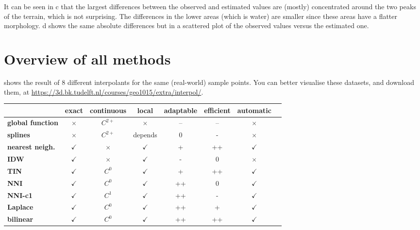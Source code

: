 It can be seen in c that the largest differences between the observed and estimated values are (mostly) concentrated around the two peaks of the terrain, which is not surprising.
The differences in the lower areas (which is water) are smaller since these areas have a flatter morphology.
d shows the same absolute differences but in a scattered plot of the observed values versus the estimated one.



%
\section{Overview of all methods}

 shows the result of 8 different interpolants for the same (real-world) sample points.
You can better visualise these datasets, and download them, at \url{https://3d.bk.tudelft.nl/courses/geo1015/extra/interpol/}.


\begin{tabular}{@{}lccccccl@{}}
\toprule
                         & exact         & continuous & local        & adaptable & efficient & automatic \\ \midrule
\textbf{global function} & $\times$      & $C^{2+}$   & $\times$     & --        & --        & $\times$     \\
\textbf{splines}         & $\times$      & $C^{2+}$   & depends      & 0         & -         & $\times$     \\ 
\textbf{nearest neigh.}  & $\checkmark$  & $\times$   & $\checkmark$ & +         & ++        & $\checkmark$ \\ 
\textbf{IDW}             & $\checkmark$  & $\times$   & $\checkmark$ & -         & 0         & $\times$     \\ 
\textbf{TIN}             & $\checkmark$  & $C^0$      & $\checkmark$ & +         & ++        & $\checkmark$ \\ 
\textbf{NNI}             & $\checkmark$  & $C^0$      & $\checkmark$ & ++        & 0         & $\checkmark$ \\ 
\textbf{NNI-c1}          & $\checkmark$  & $C^1$      & $\checkmark$ & ++        & -         & $\checkmark$ \\ 
\textbf{Laplace}         & $\checkmark$  & $C^0$      & $\checkmark$ & ++        & +         & $\checkmark$ \\ 
\textbf{bilinear}        & $\checkmark$  & $C^0$      & $\checkmark$ & ++        & ++        & $\checkmark$ \\ \bottomrule
\end{tabular}


